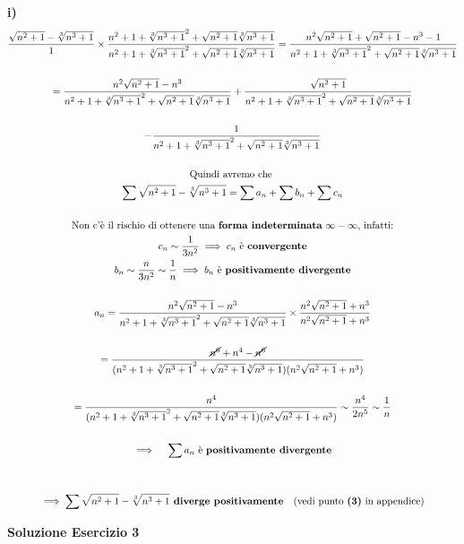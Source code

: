 \documentclass[11pt,reqno]{amsart}
\begin{document}
{\bf i)}
\begin{gather*}
  \frac{\sqrt{n^2+1} - \sqrt[3]{n^3+1}}{1} \times \frac{n^2+1+{\sqrt[3]{n^3+1}}^2+\sqrt{n^2+1}\sqrt[3]{n^3+1}}{n^2+1+{\sqrt[3]{n^3+1}}^2+\sqrt{n^2+1}\sqrt[3]{n^3+1}} = \frac{n^2\sqrt{n^2+1} + \sqrt{n^2+1} - n^3 - 1}{n^2+1+{\sqrt[3]{n^3+1}}^2+\sqrt{n^2+1}\sqrt[3]{n^3+1}}\\\\
   = \frac{n^2\sqrt{n^2+1}-n^3}{n^2+1+{\sqrt[3]{n^3+1}}^2+\sqrt{n^2+1}\sqrt[3]{n^3+1}} + \frac{\sqrt{n^2+1}}{{n^2+1+{\sqrt[3]{n^3+1}}^2+\sqrt{n^2+1}\sqrt[3]{n^3+1}}}\\\\
  - \frac{1}{n^2+1+{\sqrt[3]{n^3+1}}^2+\sqrt{n^2+1}\sqrt[3]{n^3+1}}\\\\
  \text{Quindi avremo che }\\ \sum \sqrt{n^2+1} - \sqrt[3]{n^3+1} = \sum a_n + \sum b_n + \sum c_n\\\\
  \text{Non c'è il rischio di ottenere una } \textbf{forma indeterminata} \,\, \infty - \infty \text{, infatti:}\\
  c_n \sim \frac{1}{3n^2} \implies c_n \text{ è } \textbf{convergente}\\
  b_n \sim \frac{n}{3n^2} \sim \frac{1}{n} \implies b_n \text{ è } \textbf{positivamente divergente}\\\\
  a_n = \frac{n^2\sqrt{n^2+1}-n^3}{n^2+1+{\sqrt[3]{n^3+1}}^2+\sqrt{n^2+1}\sqrt[3]{n^3+1}} \times \frac{n^2\sqrt{n^2+1}+n^3}{n^2\sqrt{n^2+1}+n^3}\\\\
  = \frac{\cancel{n^6}+n^4-\cancel{n^6}}{(n^2+1+{\sqrt[3]{n^3+1}}^2+\sqrt{n^2+1}\sqrt[3]{n^3+1})(n^2\sqrt{n^2+1}+n^3)}\\\\
  = \frac{n^4}{(n^2+1+{\sqrt[3]{n^3+1}}^2+\sqrt{n^2+1}\sqrt[3]{n^3+1})(n^2\sqrt{n^2+1}+n^3)} \sim \frac{n^4}{2n^5} \sim \frac{1}{n}\\\\
  \implies \quad \sum a_n \text{ è } \textbf{positivamente divergente}\\\\\\
  \implies \sum \sqrt{n^2+1} - \sqrt[3]{n^3+1} \textbf{ diverge positivamente} \quad \text{(vedi punto } \textbf{(3)} \text{ in appendice)}
\end{gather*}

\newpage
\centerline{\bf Soluzione Esercizio 3 }
\bigskip
\end{document}
